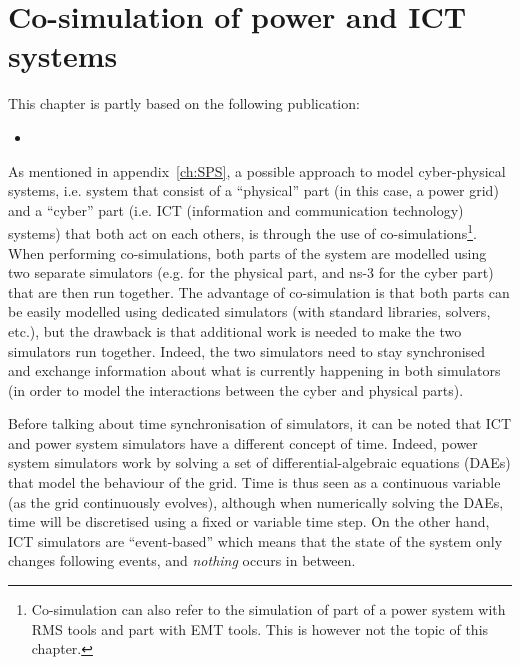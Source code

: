\chapter{Co-simulation of power and ICT systems}
\label{ch:cosim}
\minitoc

\begin{tcolorbox}[width=\linewidth, sharp corners=all,
    colback=white!80!black,
    colframe=white!80!black]
This chapter is partly based on the following publication:
\begin{itemize}
    \item {}
\end{itemize}
\end{tcolorbox}

As mentioned in appendix~\ref{ch:SPS}, a possible approach to model cyber-physical systems, i.e. system that consist of a ``physical'' part (in this case, a power grid) and a ``cyber'' part (i.e. ICT (information and communication technology) systems) that both act on each others, is through the use of co-simulations\footnote{Co-simulation can also refer to the simulation of part of a power system with RMS tools and part with EMT tools. This is however not the topic of this chapter.}. When performing co-simulations, both parts of the system are modelled using two separate simulators (e.g. \Dynawo{} for the physical part, and ns-3 for the cyber part) that are then run together. The advantage of co-simulation is that both parts can be easily modelled using dedicated simulators (with standard libraries, solvers, etc.), but the drawback is that additional work is needed to make the two simulators run together. Indeed, the two simulators need to stay synchronised and exchange information about what is currently happening in both simulators (in order to model the interactions between the cyber and physical parts).

Before talking about time synchronisation of simulators, it can be noted that ICT and power system simulators have a different concept of time. Indeed, power system simulators work by solving a set of differential-algebraic equations (DAEs) that model the behaviour of the grid. Time is thus seen as a continuous variable (as the grid continuously evolves), although when numerically solving the DAEs, time will be discretised using a fixed or variable time step. On the other hand, ICT simulators are ``event-based'' which means that the state of the system only changes following events, and \emph{nothing} occurs in between.

